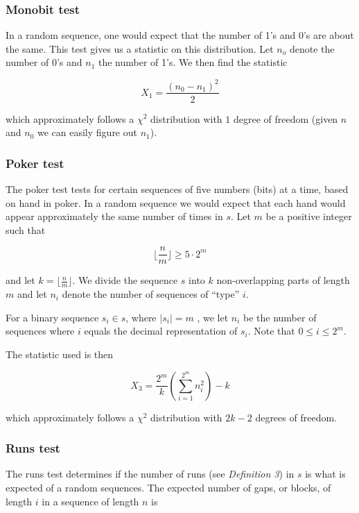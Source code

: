 \documentclass[a4paper]{article}           %
\begin{document}
\subsubsection{Monobit test}

In a random sequence, one would expect that the number of 1's and 0's are about the same. This test gives us a statistic on this distribution. Let $n_o$ denote the number of 0's and $n_1$ the number of 1's. We then find the statistic

\begin{equation}
X_1 = \frac{(n_0 - n_1)^2}{2}
\end{equation}

which approximately follows a $\chi^2$ distribution with $1$ degree of freedom (given $n$ and $n_0$ we can easily figure out $n_1$). 

\subsubsection{Poker test}

The poker test tests for certain sequences of five numbers (bits) at a time, based on hand in poker. In a random sequence we would expect that each hand would appear approximately the same number of times in $s$. Let $m$ be a positive integer such that 

\[
\lfloor \frac n m \rfloor \geq 5 \cdot 2^m  
\]

and let $k = \lfloor \frac n m \rfloor$. We divide the sequence $s$ into $k$ non-overlapping parts of length $m$ and let $n_i$ denote the number of sequences of ``type'' $i$.

For a binary sequence $s_i \in s$, where $|s_i| = m$ , we let $n_i$ be the number of sequences where $i$ equals the decimal representation of $s_i$. Note that $0 \leq i \leq 2^m$. 

The statistic used is then

\begin{equation}
X_3 = \frac{2^m}{k} \left( \sum_{i=1}^{2^m} n_i^2 \right) - k
\end{equation}

which approximately follows a $\chi^2$ distribution with $2k - 2$ degrees of freedom.
 
\subsubsection{Runs test}

The runs test determines if the number of runs (see \textit{Definition 3}) in $s$ is what is expected of a random sequences. The expected number of gaps, or blocks, of length $i$ in a sequence of length $n$ is
\end{document}
